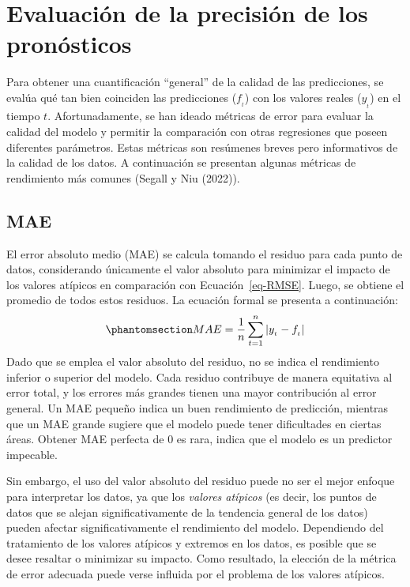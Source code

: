 \documentclass[
  us-letterpaper,
]{scrreprt}
\theoremstyle{plain}
\theoremstyle{definition}
\theoremstyle{plain}
\theoremstyle{definition}
\theoremstyle{remark}
\begin{document}
\section{Evaluación de la precisión de los
pronósticos}\label{evaluaciuxf3n-de-la-precisiuxf3n-de-los-pronuxf3sticos}

Para obtener una cuantificación ``general'' de la calidad de las
predicciones, se evalúa qué tan bien coinciden las predicciones
(\(f_{_t}\)) con los valores reales (\(y_{_t}\)) en el tiempo \(t\).
Afortunadamente, se han ideado métricas de error para evaluar la calidad
del modelo y permitir la comparación con otras regresiones que poseen
diferentes parámetros. Estas métricas son resúmenes breves pero
informativos de la calidad de los datos. A continuación se presentan
algunas métricas de rendimiento más comunes (Segall y Niu (2022)).

\subsection{MAE}\label{mae}

El error absoluto medio (MAE) se calcula tomando el residuo para cada
punto de datos, considerando únicamente el valor absoluto para minimizar
el impacto de los valores atípicos en comparación con
Ecuación~\ref{eq-RMSE}. Luego, se obtiene el promedio de todos estos
residuos. La ecuación formal se presenta a continuación:
\begin{equation}\phantomsection\label{eq-MAE}{MAE= \frac{1}{n}\sum_{t=1}^n |y_{_t}-f_{_t}|}\end{equation}
Dado que se emplea el valor absoluto del residuo, no se indica el
rendimiento inferior o superior del modelo. Cada residuo contribuye de
manera equitativa al error total, y los errores más grandes tienen una
mayor contribución al error general. Un MAE pequeño indica un buen
rendimiento de predicción, mientras que un MAE grande sugiere que el
modelo puede tener dificultades en ciertas áreas. Obtener MAE perfecta
de 0 es rara, indica que el modelo es un predictor impecable.

Sin embargo, el uso del valor absoluto del residuo puede no ser el mejor
enfoque para interpretar los datos, ya que los \emph{valores atípicos}
(es decir, los puntos de datos que se alejan significativamente de la
tendencia general de los datos) pueden afectar significativamente el
rendimiento del modelo. Dependiendo del tratamiento de los valores
atípicos y extremos en los datos, es posible que se desee resaltar o
minimizar su impacto. Como resultado, la elección de la métrica de error
adecuada puede verse influida por el problema de los valores atípicos.
\end{document}
